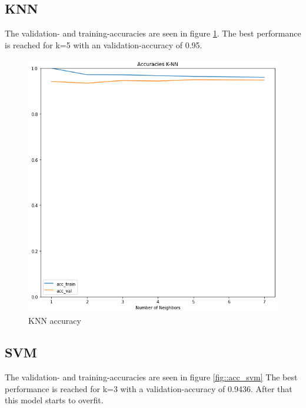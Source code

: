 \documentclass[12pt,a4paper]{scrartcl}		%
\begin{document}
    \subsection{KNN}
        The validation- and training-accuracies are seen in figure \ref{fig::acc_knn}.  
        The best performance is reached for k=5 with an validation-accuracy of 0.95. 

        \begin{figure}[h]
            \centering
            \includegraphics[scale = 0.45]{acc_knn.png}
            \caption{KNN accuracy}
            \label{fig::acc_knn}
        \end{figure} 

    \subsection{SVM}
        The validation- and training-accuracies are seen in figure \ref{fig::acc_svm}
        The best performance is reached for k=3 with a validation-accuracy of 0.9436. After that this model starts to overfit. 
\end{document}
